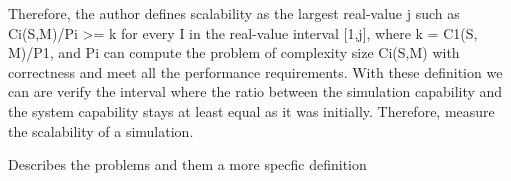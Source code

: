 Therefore, the author defines scalability as the largest real-value j such as Ci(S,M)/Pi >= k for every I in the real-value interval [1,j], where k = C1(S, M)/P1, and Pi can compute the problem of complexity size Ci(S,M) with correctness and meet all the performance requirements. With these definition we can are verify the interval where the ratio between the simulation capability and the system capability stays at least equal as it was initially. Therefore, measure the scalability of a simulation.


Describes the problems and them a more specfic definition
